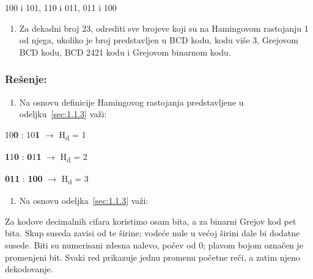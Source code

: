 \documentclass[a4paper,11pt]{article}
\numberwithin{equation}{section}
\newcommand{\istaknutbit}[1]{\textcolor{Primary!85!black}{\ifmmode\mathbf{#1}\else\textbf{#1}\fi}}
\begin{document}
100 i 101, 110 i 011, 011 i 100



\begin{enumerate}[label=\alph*),start=2,leftmargin=*]
\item Za dekadni broj 23, odrediti sve brojeve koji su na Hamingovom rastojanju 1 od njega, ukoliko je broj predstavljen u BCD kodu, kodu više 3, Grejovom BCD kodu, BCD 2421 kodu i Grejovom binarnom kodu.

\end{enumerate}


\subsubsection*{Rešenje:}


\begin{enumerate}[label=\alph*),start=1,leftmargin=*]
\item Na osnovu definicije Hamingovog rastojanja predstavljene u odeljku~\ref{sec:1.1.3} važi:

\end{enumerate}


10\istaknutbit{0} : 10\istaknutbit{1} \ensuremath{\to} H\textsubscript{d} = 1


\istaknutbit{1}1\istaknutbit{0} : \istaknutbit{0}1\istaknutbit{1} \ensuremath{\to} H\textsubscript{d} = 2

\istaknutbit{0}\istaknutbit{1}\istaknutbit{1} : \istaknutbit{1}\istaknutbit{0}\istaknutbit{0} \ensuremath{\to} H\textsubscript{d} = 3

\begin{enumerate}[label=\alph*),start=2,leftmargin=*]
\item Na osnovu odeljka~\ref{sec:1.1.3} važi:

\end{enumerate}

Za kodove decimalnih cifara koristimo osam bita, a za binarni Grejov kod pet bita. Skup suseda zavisi od te širine; vodeće nule u većoj širini dale bi dodatne susede. Biti su numerisani zdesna nalevo, počev od 0; plavom bojom označen je promenjeni bit. Svaki red prikazuje jednu promenu početne reči, a zatim njeno dekodovanje.\par
\end{document}
